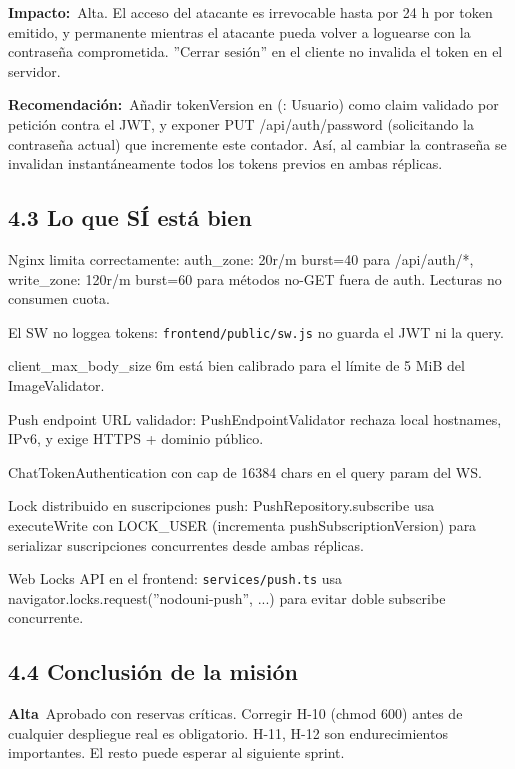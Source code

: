 \documentclass[10pt,a4paper]{article}
\newcommand{\code}[1]{\nolinkurl{#1}}
\newcommand{\badgeAlta}{\colorbox{orange!20}{\textcolor{orange!90!black}{\textbf{\footnotesize Alta}}}}
\begin{document}
\noindent\textbf{Impacto:}\ Alta. El acceso del atacante es irrevocable hasta por 24 h por token emitido, y permanente mientras el atacante pueda volver a loguearse con la contraseña comprometida. ''Cerrar sesión'' en el cliente no invalida el token en el servidor.\par\vspace{0.4em}
\noindent\textbf{Recomendación:}\ Añadir tokenVersion en (: Usuario) como claim validado por petición contra el JWT, y exponer PUT /api/auth/password (solicitando la contraseña actual) que incremente este contador. Así, al cambiar la contraseña se invalidan instantáneamente todos los tokens previos en ambas réplicas.\par\vspace{0.4em}
\subsection{4.3 Lo que SÍ está bien}
Nginx limita correctamente: auth\_zone: 20r/m burst=40 para /api/auth/*, write\_zone: 120r/m burst=60 para métodos no-GET fuera de auth. Lecturas no consumen cuota.\par\vspace{0.4em}
El SW no loggea tokens: \code{frontend/public/sw.js} no guarda el JWT ni la query.\par\vspace{0.4em}
client\_max\_body\_size 6m está bien calibrado para el límite de 5 MiB del ImageValidator.\par\vspace{0.4em}
Push endpoint URL validador: PushEndpointValidator rechaza local hostnames, IPv6, y exige HTTPS + dominio público.\par\vspace{0.4em}
ChatTokenAuthentication con cap de 16384 chars en el query param del WS.\par\vspace{0.4em}
Lock distribuido en suscripciones push: PushRepository.subscribe usa executeWrite con LOCK\_USER (incrementa pushSubscriptionVersion) para serializar suscripciones concurrentes desde ambas réplicas.\par\vspace{0.4em}
Web Locks API en el frontend: \code{services/push.ts} usa navigator.locks.request(''nodouni-push'', ...) para evitar doble subscribe concurrente.\par\vspace{0.4em}
\subsection{4.4 Conclusión de la misión}
\badgeAlta\  Aprobado con reservas críticas. Corregir H-10 (chmod 600) antes de cualquier despliegue real es obligatorio. H-11, H-12 son endurecimientos importantes. El resto puede esperar al siguiente sprint.\par\vspace{0.4em}
\end{document}
